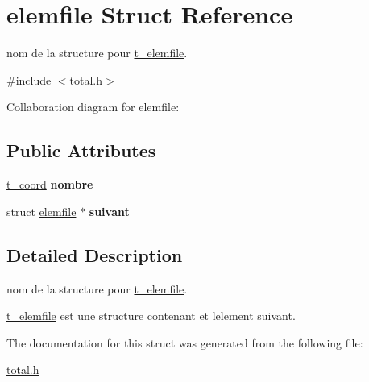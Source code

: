 \hypertarget{structelemfile}{}\section{elemfile Struct Reference}
\label{structelemfile}


nom de la structure pour \hyperlink{structt__elemfile}{t\+\_\+elemfile}.  




{\ttfamily \#include $<$total.\+h$>$}



Collaboration diagram for elemfile\+:
\subsection*{Public Attributes}
\begin{DoxyCompactItemize}
\item 
\hyperlink{structt__coord}{t\+\_\+coord} {\bfseries nombre}\hypertarget{structelemfile_a50473116d79b1083db184bc369e6a046}{}\label{structelemfile_a50473116d79b1083db184bc369e6a046}

\item 
struct \hyperlink{structelemfile}{elemfile} $\ast$ {\bfseries suivant}\hypertarget{structelemfile_ac30f23198c9ecf2929d10096f7ffcc3f}{}\label{structelemfile_ac30f23198c9ecf2929d10096f7ffcc3f}

\end{DoxyCompactItemize}


\subsection{Detailed Description}
nom de la structure pour \hyperlink{structt__elemfile}{t\+\_\+elemfile}. 

\hyperlink{structt__elemfile}{t\+\_\+elemfile} est une structure contenant et l\textquotesingle{}element suivant. 

The documentation for this struct was generated from the following file\+:\begin{DoxyCompactItemize}
\item 
\hyperlink{total_8h}{total.\+h}\end{DoxyCompactItemize}
